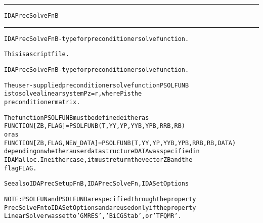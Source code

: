 \begin{samepage}
\hrule
\begin{center}
{\large \verb!IDAPrecSolveFnB!}
\label{p:IDAPrecSolveFnB}
\end{center}
\hrule\vspace{0.1in}



\begin{alltt}
IDAPrecSolveFnB - type for preconditioner solve function.
\end{alltt}

\end{samepage}



\begin{samepage}


\begin{alltt}
This is a script file. 
\end{alltt}

\end{samepage}



\begin{alltt}
IDAPrecSolveFnB - type for preconditioner solve function.

   The user-supplied preconditioner solve function PSOLFUNB
   is to solve a linear system P z = r, where P is the
   preconditioner matrix.

   The function PSOLFUNB must be defined either as
        FUNCTION [ZB,FLAG] = PSOLFUNB(T,YY,YP,YYB,YPB,RRB,RB)
   or as
        FUNCTION [ZB,FLAG,NEW_DATA] = PSOLFUNB(T,YY,YP,YYB,YPB,RRB,RB,DATA)
   depending on whether a user data structure DATA was specified in
   IDAMalloc. In either case, it must return the vector ZB and the
   flag FLAG.

   See also IDAPrecSetupFnB, IDAPrecSolveFn, IDASetOptions

   NOTE: PSOLFUN and PSOLFUNB are specified through the property
   PrecSolveFn to IDASetOptions and are used only if the property
   LinearSolver was set to 'GMRES', 'BiCGStab', or 'TFQMR'.
\end{alltt}






\vspace{0.1in}